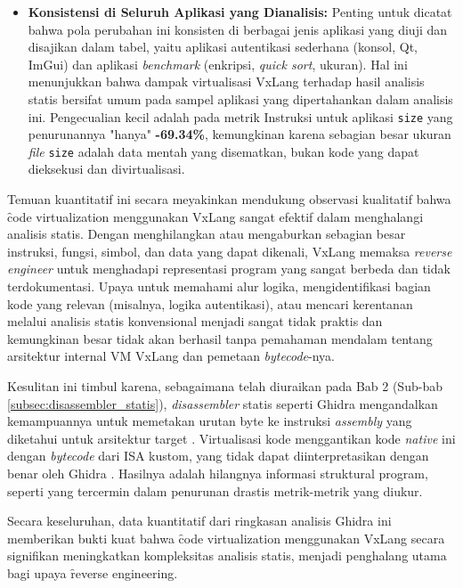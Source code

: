 \begin{itemize}
    \item \textbf{Konsistensi di Seluruh Aplikasi yang Dianalisis:}
    Penting untuk dicatat bahwa pola perubahan ini konsisten di berbagai jenis aplikasi yang diuji dan disajikan dalam tabel, yaitu aplikasi autentikasi sederhana (konsol, Qt, ImGui) dan aplikasi \textit{benchmark} (enkripsi, \textit{quick sort}, ukuran). Hal ini menunjukkan bahwa dampak virtualisasi VxLang terhadap hasil analisis statis bersifat umum pada sampel aplikasi yang dipertahankan dalam analisis ini. Pengecualian kecil adalah pada metrik Instruksi untuk aplikasi \texttt{size} yang penurunannya "hanya" \textbf{-69.34\%}, kemungkinan karena sebagian besar ukuran \textit{file} \texttt{size} adalah data mentah yang disematkan, bukan kode yang dapat dieksekusi dan divirtualisasi.

\end{itemize}

Temuan kuantitatif ini secara meyakinkan mendukung observasi kualitatif bahwa \f{code virtualization} menggunakan VxLang sangat efektif dalam menghalangi analisis statis. Dengan menghilangkan atau mengaburkan sebagian besar instruksi, fungsi, simbol, dan data yang dapat dikenali, VxLang memaksa \textit{reverse engineer} untuk menghadapi representasi program yang sangat berbeda dan tidak terdokumentasi. Upaya untuk memahami alur logika, mengidentifikasi bagian kode yang relevan (misalnya, logika autentikasi), atau mencari kerentanan melalui analisis statis konvensional menjadi sangat tidak praktis dan kemungkinan besar tidak akan berhasil tanpa pemahaman mendalam tentang arsitektur internal VM VxLang dan pemetaan \textit{bytecode}-nya.

Kesulitan ini timbul karena, sebagaimana telah diuraikan pada Bab 2 (Sub-bab \ref{subsec:disassembler_statis}), \textit{disassembler} statis seperti Ghidra mengandalkan kemampuannya untuk memetakan urutan byte ke instruksi \textit{assembly} yang diketahui untuk arsitektur target \cite{Sikorski2012, Eilam2011}. Virtualisasi kode menggantikan kode \textit{native} ini dengan \textit{bytecode} dari ISA kustom, yang tidak dapat diinterpretasikan dengan benar oleh Ghidra \cite{Ko2007}. Hasilnya adalah hilangnya informasi struktural program, seperti yang tercermin dalam penurunan drastis metrik-metrik yang diukur.

Secara keseluruhan, data kuantitatif dari ringkasan analisis Ghidra ini memberikan bukti kuat bahwa \f{code virtualization} menggunakan VxLang secara signifikan meningkatkan kompleksitas analisis statis, menjadi penghalang utama bagi upaya \f{reverse engineering}.

